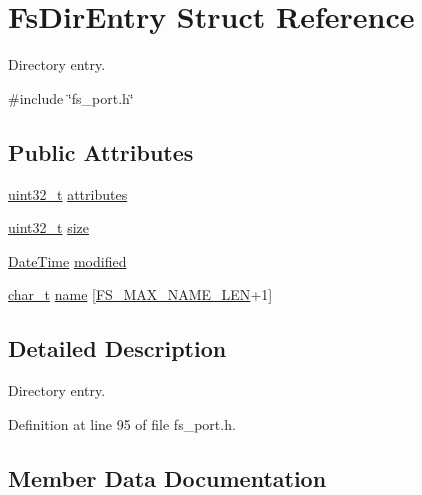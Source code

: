 \hypertarget{structFsDirEntry}{}\section{Fs\+Dir\+Entry Struct Reference}
\label{structFsDirEntry}


Directory entry.  




{\ttfamily \#include \char`\"{}fs\+\_\+port.\+h\char`\"{}}

\subsection*{Public Attributes}
\begin{DoxyCompactItemize}
\item 
\hyperlink{stdint_8h_a435d1572bf3f880d55459d9805097f62}{uint32\+\_\+t} \hyperlink{structFsDirEntry_ae6bc73c8708ef8541ed7dc2c5f802e96}{attributes}
\item 
\hyperlink{stdint_8h_a435d1572bf3f880d55459d9805097f62}{uint32\+\_\+t} \hyperlink{structFsDirEntry_acface51e05962d480c731d0b0c7b1d0e}{size}
\item 
\hyperlink{structDateTime}{Date\+Time} \hyperlink{structFsDirEntry_abd332197750fa0d7181d206355a86b99}{modified}
\item 
\hyperlink{compiler__port_8h_a40bb5262bf908c328fbcfbe5d29d0201}{char\+\_\+t} \hyperlink{structFsDirEntry_ab2a81b6bc89dc202e25448d2afdbae5b}{name} \mbox{[}\hyperlink{fs__port_8h_a17f57e73738b6fd8b600eb2b4e0e5c71}{F\+S\+\_\+\+M\+A\+X\+\_\+\+N\+A\+M\+E\+\_\+\+L\+EN}+1\mbox{]}
\end{DoxyCompactItemize}


\subsection{Detailed Description}
Directory entry. 

Definition at line 95 of file fs\+\_\+port.\+h.



\subsection{Member Data Documentation}
\mbox{\label{structFsDirEntry_ae6bc73c8708ef8541ed7dc2c5f802e96}} 
